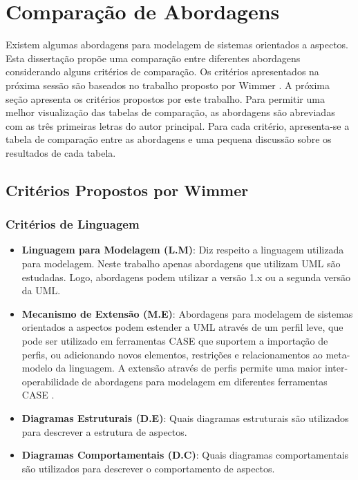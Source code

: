 \section{Comparação de Abordagens}

Existem algumas abordagens para modelagem de sistemas orientados a aspectos. Esta dissertação propõe uma comparação entre diferentes abordagens
considerando alguns critérios de comparação. Os critérios apresentados na próxima sessão são baseados no trabalho proposto por Wimmer
\cite{wimmer:2011:SUA:1978802.1978807}. A próxima seção apresenta os critérios propostos por este trabalho. Para permitir uma
melhor visualização das tabelas de comparação, as abordagens são abreviadas com as três primeiras letras do autor principal. 
Para cada critério, apresenta-se a tabela de comparação entre as abordagens e uma pequena discussão sobre os resultados de
cada tabela.

\subsection{Critérios Propostos por Wimmer}

\subsubsection{Critérios de Linguagem}

\begin{itemize}
	\item \textbf{Linguagem para Modelagem (L.M)}: Diz respeito a linguagem utilizada para modelagem. Neste trabalho apenas abordagens que utilizam UML
	são estudadas. Logo, abordagens podem utilizar a versão 1.x ou a segunda versão da UML.
	\item \textbf{Mecanismo de Extensão (M.E)}: Abordagens para modelagem de sistemas orientados a aspectos podem estender a UML através de um perfil
	leve, que pode ser utilizado em ferramentas CASE que suportem a importação de perfis, ou adicionando novos elementos, restrições e relacionamentos ao
	meta-modelo da linguagem. A extensão através de perfis permite uma maior inter-operabilidade de abordagens para modelagem em diferentes ferramentas
	CASE \cite{Booch:2005:UML:1088874}.
	\item \textbf{Diagramas Estruturais (D.E)}: Quais diagramas estruturais são utilizados para descrever a estrutura de aspectos.
	\item \textbf{Diagramas Comportamentais (D.C)}: Quais diagramas comportamentais são utilizados para descrever o comportamento de aspectos.
\end{itemize}

